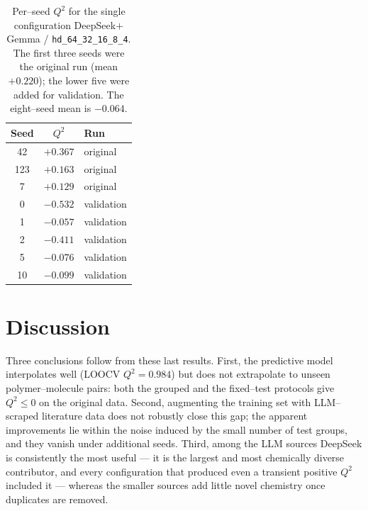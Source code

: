\begin{table}[htbp]
	\centering
	\caption{Per--seed $Q^2$ for the single configuration DeepSeek$+$Gemma / \texttt{hd\_64\_32\_16\_8\_4}. The first three seeds were the original run (mean $+0.220$); the lower five were added for validation. The eight--seed mean is $-0.064$.}
	\label{tab:cont_seed_artifact}
	\begin{tabular}{ccl}
		\toprule
		\textbf{Seed} & \textbf{$Q^2$} & \textbf{Run} \\
		\midrule
		42  & $+0.367$ & original \\
		123 & $+0.163$ & original \\
		7   & $+0.129$ & original \\
		0   & $-0.532$ & validation \\
		1   & $-0.057$ & validation \\
		2   & $-0.411$ & validation \\
		5   & $-0.076$ & validation \\
		10  & $-0.099$ & validation \\
		\bottomrule
	\end{tabular}
\end{table}

\section{Discussion}
\label{sec:cont_discussion}

Three conclusions follow from these last results. First, the predictive model interpolates well (LOOCV $Q^2 = 0.984$) but does not extrapolate to unseen polymer--molecule pairs: both the grouped and the fixed--test protocols give $Q^2 \le 0$ on the original data. Second, augmenting the training set with LLM--scraped literature data does not robustly close this gap; the apparent improvements lie within the noise induced by the small number of test groups, and they vanish under additional seeds. Third, among the LLM sources DeepSeek is consistently the most useful --- it is the largest and most chemically diverse contributor, and every configuration that produced even a transient positive $Q^2$ included it --- whereas the smaller sources add little novel chemistry once duplicates are removed.

